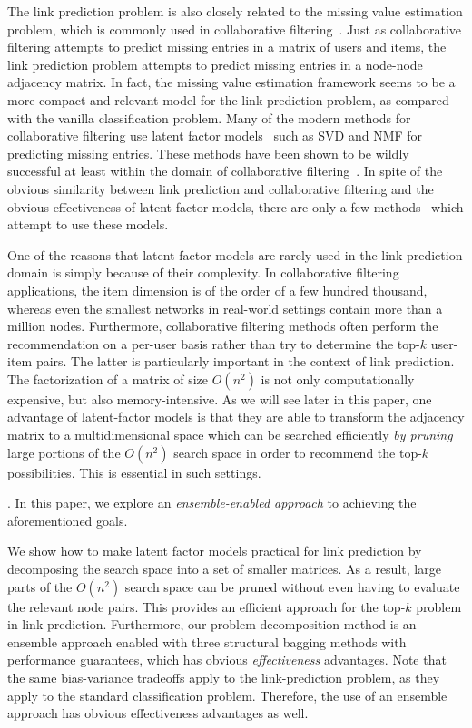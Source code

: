\documentclass[10pt,journal,compsoc]{IEEEtran}
\newcommand{\stitle}[1]{\vspace{0.5ex}\noindent{\bf #1}}
\newcommand{\SVD}{{\sf SVD}\xspace}
\newcommand{\NMF}{{\sf NMF}\xspace }
\begin{document}
The link prediction problem is also closely related to the missing value
estimation problem, which is commonly used in collaborative
filtering~\cite{adom}.  Just as collaborative filtering attempts to
predict missing entries in a matrix of users and items, the link
prediction problem attempts to predict missing entries in a
node-node adjacency matrix. In fact, the missing value estimation
framework seems to be a more compact and relevant model for the link
prediction problem, as compared with the vanilla classification
problem.  Many of the modern methods for collaborative filtering use
latent factor models~\cite{conceptualr,web} such as \SVD and
\NMF for predicting missing entries. These methods have been
shown to be wildly successful at least within the domain of
collaborative filtering~\cite{web}. In spite of the obvious
similarity between link prediction and collaborative filtering and
the obvious effectiveness of latent factor models, there are only a
few methods~\cite{menon} which attempt to use these models.

One of the reasons that latent factor models are rarely used in the
link prediction domain is simply because of their complexity. In
collaborative filtering applications, the item dimension is of the
order of a few hundred thousand, whereas even the smallest networks
in real-world settings contain more than a million nodes.
Furthermore, collaborative filtering methods  often perform the
recommendation on a per-user basis rather than try to determine
the top-$k$ user-item pairs.  The latter is particularly important
in the context of link prediction. The factorization of a matrix of
size $O(n^2)$ is not only computationally expensive, but also
memory-intensive.  As we will see later in this paper, one advantage
of  latent-factor models is that they are able to  transform the
adjacency matrix to a multidimensional space which can be searched
efficiently {\em by pruning} large portions of the $O(n^2)$ search
space in order to recommend the top-$k$ possibilities. This is
essential in such settings.

\stitle{Contributions}. In this paper, we explore an {\em ensemble-enabled approach} to
achieving the aforementioned goals.

We show how to make latent factor models
practical for link prediction by decomposing the search space into a
 set of smaller matrices. As a result, large parts of the $O(n^2)$
search space can be pruned without even having to evaluate the
relevant node pairs. This provides an efficient approach for the
top-$k$ problem in link prediction.  Furthermore, our problem
decomposition method is an ensemble approach enabled with three structural bagging methods with performance guarantees, which has obvious {\em
effectiveness} advantages. Note that the same bias-variance
tradeoffs apply to the link-prediction problem, as they apply to the
standard classification problem. Therefore, the use of an ensemble
approach has obvious effectiveness advantages as well.
\end{document}
